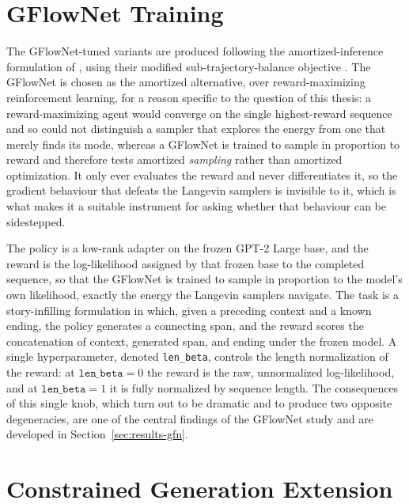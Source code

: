 \section{GFlowNet Training}
\label{sec:meth-gfn}

The GFlowNet-tuned variants are produced following the amortized-inference formulation of \citet{hu2024amortizing}, using their modified sub-trajectory-balance objective \citep{malkin2022trajectory, madan2023learning}. The GFlowNet is chosen as the amortized alternative, over reward-maximizing reinforcement learning, for a reason specific to the question of this thesis: a reward-maximizing agent would converge on the single highest-reward sequence and so could not distinguish a sampler that explores the energy from one that merely finds its mode, whereas a GFlowNet is trained to sample in proportion to reward and therefore tests amortized \emph{sampling} rather than amortized optimization. It only ever evaluates the reward and never differentiates it, so the gradient behaviour that defeats the Langevin samplers is invisible to it, which is what makes it a suitable instrument for asking whether that behaviour can be sidestepped.

The policy is a low-rank adapter \citep{hu2022lora} on the frozen GPT-2 Large base, and the reward is the log-likelihood assigned by that frozen base to the completed sequence, so that the GFlowNet is trained to sample in proportion to the model's own likelihood, exactly the energy the Langevin samplers navigate. The task is a story-infilling formulation in which, given a preceding context and a known ending, the policy generates a connecting span, and the reward scores the concatenation of context, generated span, and ending under the frozen model. A single hyperparameter, denoted \texttt{len\_beta}, controls the length normalization of the reward: at $\texttt{len\_beta}=0$ the reward is the raw, unnormalized log-likelihood, and at $\texttt{len\_beta}=1$ it is fully normalized by sequence length. The consequences of this single knob, which turn out to be dramatic and to produce two opposite degeneracies, are one of the central findings of the GFlowNet study and are developed in Section~\ref{sec:results-gfn}.

\section{Constrained Generation Extension}
\label{sec:meth-constrained}

